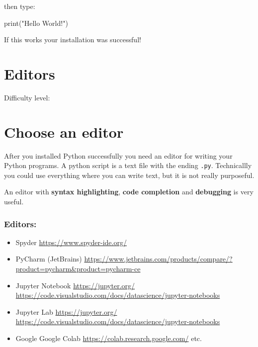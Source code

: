 \documentclass[
  letterpaper,
  DIV=11,
  numbers=noendperiod]{scrreprt}
\newenvironment{Shaded}{\begin{snugshade}}{\end{snugshade}}
\newcommand{\BuiltInTok}[1]{\textcolor[rgb]{0.00,0.23,0.31}{#1}}
\newcommand{\NormalTok}[1]{\textcolor[rgb]{0.00,0.23,0.31}{#1}}
\newcommand{\StringTok}[1]{\textcolor[rgb]{0.13,0.47,0.30}{#1}}
\providecommand{\tightlist}{%
  \setlength{\itemsep}{0pt}\setlength{\parskip}{0pt}}\usepackage{longtable,booktabs,array}
\begin{document}
then type:

\begin{Shaded}
\begin{Highlighting}[]
\BuiltInTok{print}\NormalTok{(}\StringTok{"Hello World!"}\NormalTok{)}
\end{Highlighting}
\end{Shaded}

If this works your installation was successful!

\chapter{Editors}\label{editors}

Difficulty level: { }

\chapter*{Choose an editor}\label{choose-an-editor}


After you installed Python successfully you need an editor for writing
your Python programs. A python script is a text file with the ending
\texttt{.py}. Technicallly you could use everything where you can write
text, but it is not really purposeful.

An editor with \textbf{syntax highlighting}, \textbf{code completion}
and \textbf{debugging} is very useful.

\subsection*{Editors:}\label{editors-1}

\begin{itemize}
\tightlist
\item
  Spyder \url{https://www.spyder-ide.org/}
\item
  PyCharm (JetBrains)
  \url{https://www.jetbrains.com/products/compare/?product=pycharm&product=pycharm-ce}
\item
  Jupyter Notebook \url{https://jupyter.org/}
  \url{https://code.visualstudio.com/docs/datascience/jupyter-notebooks}
\item
  Jupyter Lab \url{https://jupyter.org/}
  \url{https://code.visualstudio.com/docs/datascience/jupyter-notebooks}
\item
  Google Google Colab \url{https://colab.research.google.com/} etc.
\end{itemize}
\end{document}
